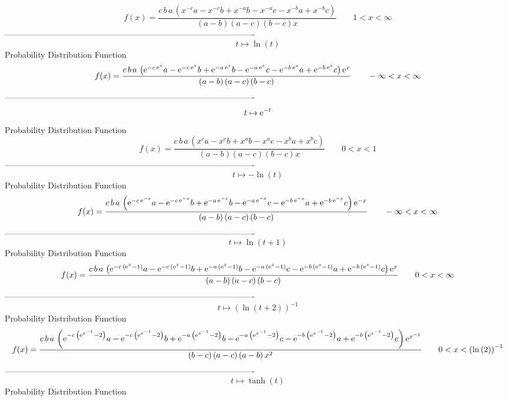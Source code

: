 \documentclass[12pt]{article}
\begin{document}
$$  f(x)={\frac {c\,b\,a\, \left( {x}^{-c}a-{x}^{-c}b+{x}^{-a}b-{x}^{-a}c-{x}^{
-b}a+{x}^{-b}c \right) }{ \left( a-b \right)  \left( a-c \right) 
 \left( b-c \right) x}}
 \qquad1
 < x < \infty 
$$-------------------------------------------------------------------------------------------  \\$$t\mapsto \ln  \left( t \right) 
$$Probability Distribution Function 
$$  f(x)={\frac {c\,b\,a\, \left( {{\rm e}^{-c\,{{\rm e}^{x}}}}a-{{\rm e}^{-c\,
{{\rm e}^{x}}}}b+{{\rm e}^{-a\,{{\rm e}^{x}}}}b-{{\rm e}^{-a\,{{\rm e}
^{x}}}}c-{{\rm e}^{-b\,{{\rm e}^{x}}}}a+{{\rm e}^{-b\,{{\rm e}^{x}}}}c
 \right) {{\rm e}^{x}}}{ \left( a-b \right)  \left( a-c \right) 
 \left( b-c \right) }}
 \qquad-\infty 
 < x < \infty 
$$-------------------------------------------------------------------------------------------  \\$$t\mapsto {{\rm e}^{-t}}
$$Probability Distribution Function 
$$  f(x)={\frac {c\,b\,a\, \left( {x}^{c}a-{x}^{c}b+{x}^{a}b-{x}^{a}c-{x}^{b}a+
{x}^{b}c \right) }{ \left( a-b \right)  \left( a-c \right)  \left( b-c
 \right) x}}
 \qquad0
 < x < 1
$$-------------------------------------------------------------------------------------------  \\$$t\mapsto -\ln  \left( t \right) 
$$Probability Distribution Function 
$$  f(x)={\frac {c\,b\,a\, \left( {{\rm e}^{-c\,{{\rm e}^{-x}}}}a-{{\rm e}^{-c
\,{{\rm e}^{-x}}}}b+{{\rm e}^{-a\,{{\rm e}^{-x}}}}b-{{\rm e}^{-a\,{
{\rm e}^{-x}}}}c-{{\rm e}^{-b\,{{\rm e}^{-x}}}}a+{{\rm e}^{-b\,{
{\rm e}^{-x}}}}c \right) {{\rm e}^{-x}}}{ \left( a-b \right)  \left( a
-c \right)  \left( b-c \right) }}
 \qquad-\infty 
 < x < \infty 
$$-------------------------------------------------------------------------------------------  \\$$t\mapsto \ln  \left( t+1 \right) 
$$Probability Distribution Function 
$$  f(x)={\frac {c\,b\,a\, \left( {{\rm e}^{-c\, \left( {{\rm e}^{x}}-1
 \right) }}a-{{\rm e}^{-c\, \left( {{\rm e}^{x}}-1 \right) }}b+{
{\rm e}^{-a\, \left( {{\rm e}^{x}}-1 \right) }}b-{{\rm e}^{-a\,
 \left( {{\rm e}^{x}}-1 \right) }}c-{{\rm e}^{-b\, \left( {{\rm e}^{x}
}-1 \right) }}a+{{\rm e}^{-b\, \left( {{\rm e}^{x}}-1 \right) }}c
 \right) {{\rm e}^{x}}}{ \left( a-b \right)  \left( a-c \right) 
 \left( b-c \right) }}
 \qquad0
 < x < \infty 
$$-------------------------------------------------------------------------------------------  \\$$t\mapsto  \left( \ln  \left( t+2 \right)  \right) ^{-1}
$$Probability Distribution Function 
$$  f(x)={\frac {c\,b\,a\, \left( {{\rm e}^{-c\, \left( {{\rm e}^{{x}^{-1}}}-2
 \right) }}a-{{\rm e}^{-c\, \left( {{\rm e}^{{x}^{-1}}}-2 \right) }}b+
{{\rm e}^{-a\, \left( {{\rm e}^{{x}^{-1}}}-2 \right) }}b-{{\rm e}^{-a
\, \left( {{\rm e}^{{x}^{-1}}}-2 \right) }}c-{{\rm e}^{-b\, \left( {
{\rm e}^{{x}^{-1}}}-2 \right) }}a+{{\rm e}^{-b\, \left( {{\rm e}^{{x}^
{-1}}}-2 \right) }}c \right) {{\rm e}^{{x}^{-1}}}}{ \left( b-c
 \right)  \left( a-c \right)  \left( a-b \right) {x}^{2}}}
 \qquad0
 < x <  \left( \ln  \left( 2 \right)  \right) ^{-1}
$$-------------------------------------------------------------------------------------------  \\$$t\mapsto \tanh \left( t \right) 
$$Probability Distribution Function 
\end{document}
